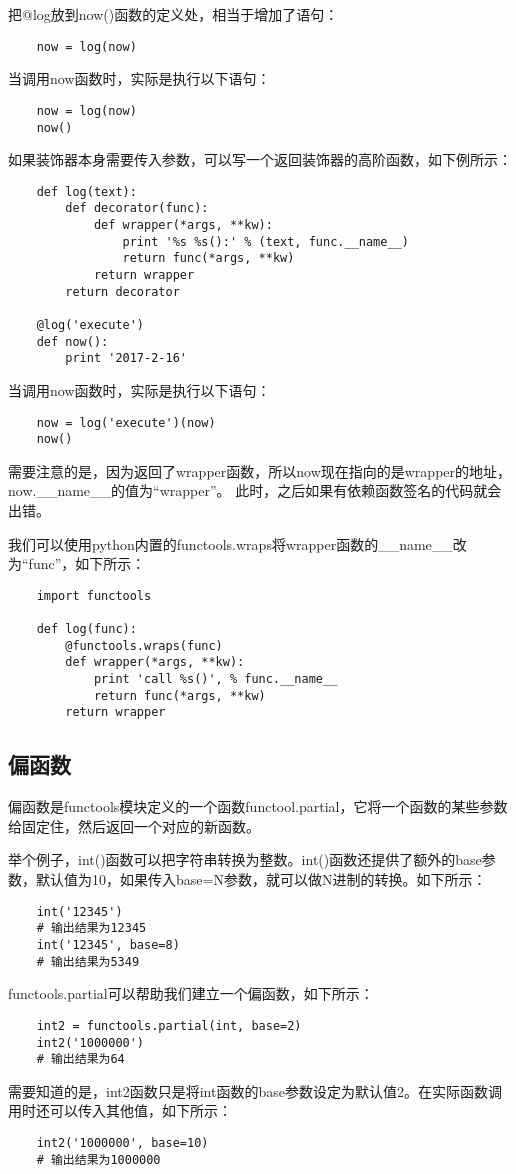 \documentclass[a4paper,left=2.5cm,right=2.5cm,11pt]{article}
\begin{document}
	把@log放到now()函数的定义处，相当于增加了语句：
	\begin{lstlisting}
	now = log(now)
	\end{lstlisting}

	当调用now函数时，实际是执行以下语句：
	\begin{lstlisting}
	now = log(now)
	now()
	\end{lstlisting}

	如果装饰器本身需要传入参数，可以写一个返回装饰器的高阶函数，如下例所示：
	\begin{lstlisting}
	def log(text):
		def decorator(func):
			def wrapper(*args, **kw):
				print '%s %s():' % (text, func.__name__)
				return func(*args, **kw)
			return wrapper
		return decorator

	@log('execute')
	def now():
		print '2017-2-16'
	\end{lstlisting}

	当调用now函数时，实际是执行以下语句：
	\begin{lstlisting}
	now = log('execute')(now)
	now()
	\end{lstlisting}

	需要注意的是，因为返回了wrapper函数，所以now现在指向的是wrapper的地址，now.\_\_name\_\_的值为“wrapper”。
	此时，之后如果有依赖函数签名的代码就会出错。\par

	我们可以使用python内置的functools.wraps将wrapper函数的\_\_name\_\_改为“func”，如下所示：
	\begin{lstlisting}
	import functools

	def log(func):
		@functools.wraps(func)
		def wrapper(*args, **kw):
			print 'call %s()', % func.__name__
			return func(*args, **kw)
		return wrapper
	\end{lstlisting}

\subsection{偏函数}
	偏函数是functools模块定义的一个函数functool.partial，它将一个函数的某些参数给固定住，然后返回一个对应的新函数。\par

	举个例子，int()函数可以把字符串转换为整数。int()函数还提供了额外的base参数，默认值为10，如果传入base=N参数，就可以做N进制的转换。如下所示：
	\begin{lstlisting}
	int('12345')
	# 输出结果为12345
	int('12345', base=8)
	# 输出结果为5349
	\end{lstlisting}

	functools.partial可以帮助我们建立一个偏函数，如下所示：
	\begin{lstlisting}
	int2 = functools.partial(int, base=2)
	int2('1000000')
	# 输出结果为64
	\end{lstlisting}

	需要知道的是，int2函数只是将int函数的base参数设定为默认值2。在实际函数调用时还可以传入其他值，如下所示：
	\begin{lstlisting}
	int2('1000000', base=10)
	# 输出结果为1000000
	\end{lstlisting}
\end{document}
